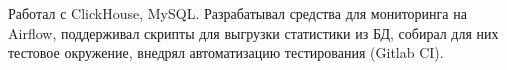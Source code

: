 Работал с ClickHouse, MySQL. Разрабатывал средства для мониторинга на Airflow, поддерживал скрипты для выгрузки статистики из БД, собирал для них тестовое окружение, внедрял автоматизацию тестирования (Gitlab CI).
